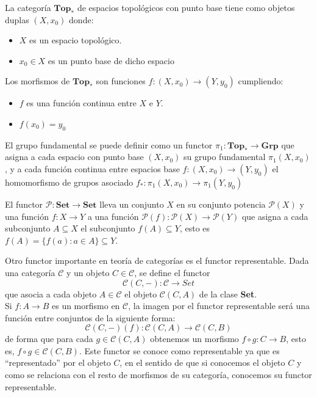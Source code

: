 \begin{ejemplo}
     La categoría $\textbf{Top}_{*}$ de espacios topológicos con punto base tiene como objetos duplas $(X,x_{0})$ donde:
    \begin{itemize}
        \item $X$ es un espacio topológico.
        \item $x_{0} \in X$ es un punto base de dicho espacio 
    \end{itemize}
    Los morfismos de $\textbf{Top}_{*}$ son funciones $f: (X,x_{0}) \longrightarrow (Y,y_{0})$ cumpliendo:
    \begin{itemize}
        \item $f$ es una función continua entre $X$ e $Y$.
        \item $f(x_{0}) = y_{0}$ 
    \end{itemize}
    El grupo fundamental se puede definir como un functor $\pi_{1}: \textbf{Top}_{*} \longrightarrow \textbf{Grp} $ que asigna a cada espacio con punto base $(X,x_{0})$ su grupo fundamental $\pi_{1}(X,x_{0})$, y a cada función continua entre espacios base $f: (X,x_{0}) \longrightarrow (Y,y_{0})$ el homomorfismo de grupos asociado $f_{*}: \pi_{1}(X,x_{0}) \longrightarrow \pi_{1}(Y,y_{0})$
\end{ejemplo}

\begin{ejemplo}
    El functor $\mathcal{P}: \textbf{Set} \longrightarrow \textbf{Set}$ lleva un conjunto $X$ en su conjunto potencia $\mathcal{P}(X)$ y una función $f: X \longrightarrow Y$ a una función $\mathcal{P}(f): \mathcal{P}(X) \longrightarrow \mathcal{P}(Y)$ que asigna a cada subconjunto $A \subseteq X$ el subconjunto $f(A) \subseteq Y$, esto es $f(A) = \{f(a) : a \in A\} \subseteq Y$.
    \label{ejemplo:potencia}
\end{ejemplo}

\begin{ejemplo}
    Otro functor importante en teoría de categorías es el functor representable. Dada una categoría $\mathscr{C}$ y un objeto $C \in \mathscr{C}$, se define el functor \begin{equation}
        \mathscr{C}(C,-): \mathscr{C} \longrightarrow Set
    \end{equation} que asocia a cada objeto $A \in \mathscr{C}$ el objeto $\mathscr{C}(C,A)$ de la clase \textbf{Set}. \\
    Si $f: A \longrightarrow B$ es un morfismo en $\mathscr{C}$, la imagen por el functor representable será una función entre conjuntos de la siguiente forma: \begin{equation}
        \mathscr{C}(C,-)(f): \mathscr{C}(C,A) \longrightarrow \mathscr{C}(C,B)
    \end{equation} de forma que para cada $g \in \mathscr{C}(C,A)$ obtenemos un morfismo $f \circ g: C \longrightarrow B$, esto es, $f \circ g \in \mathscr{C}(C,B).$
    Este functor se conoce como representable ya que es ``representado'' por el objeto $C$, en el sentido de que si conocemos el objeto $C$ y como se relaciona con el resto de morfismos de su categoría, conocemos su functor representable. 
    \label{ej:func_repre}
\end{ejemplo}

